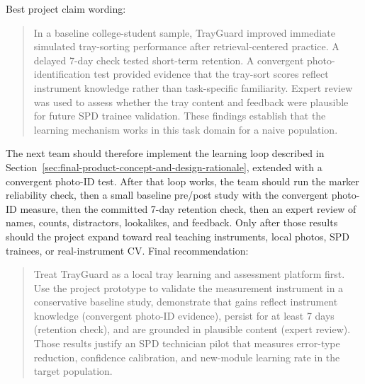 \documentclass[10pt,a4paper]{article}
\begin{document}
Best project claim wording:
\begin{quote}
In a baseline college-student sample, TrayGuard improved immediate simulated
tray-sorting performance after retrieval-centered practice. A delayed
7-day check tested short-term retention. A convergent photo-identification test
provided evidence that the tray-sort scores reflect instrument knowledge rather
than task-specific familiarity. Expert review was used to assess whether the
tray content and feedback were plausible for future SPD trainee validation.
These findings establish that the learning mechanism works in this task domain
for a naive population.
\end{quote}

The next team should therefore implement the learning loop described in Section~\ref{sec:final-product-concept-and-design-rationale}, extended with a convergent photo-ID test. After that loop works, the team should run the marker reliability check, then a
small baseline pre/post study with the convergent photo-ID measure, then the
committed 7-day retention check, then an expert review of names, counts,
distractors, lookalikes, and feedback. Only after those results should the
project expand toward real teaching instruments, local photos, SPD trainees, or
real-instrument CV.
Final recommendation:
\begin{quote}
Treat TrayGuard as a local tray learning and assessment platform first. Use
the project prototype to validate the measurement instrument in a conservative
baseline study, demonstrate that gains reflect instrument knowledge (convergent
photo-ID evidence), persist for at least 7 days (retention check), and are
grounded in plausible content (expert review). Those results justify an SPD
technician pilot that measures error-type reduction, confidence calibration, and
new-module learning rate in the target population.
\end{quote}



%
\end{document}
